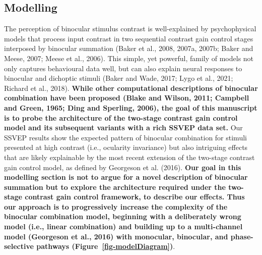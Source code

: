 \documentclass[
  12pt,
]{article}
\begin{document}
\subsection{Modelling}\label{modelling}

The perception of binocular stimulus contrast is well-explained by
psychophysical models that process input contrast in two sequential
contrast gain control stages interposed by binocular summation (Baker et
al., 2008, 2007a, 2007b; Baker and Meese, 2007; Meese et al., 2006).
This simple, yet powerful, family of models not only captures
behavioural data well, but can also explain neural responses to
binocular and dichoptic stimuli (Baker and Wade, 2017; Lygo et al.,
2021; Richard et al., 2018). \textbf{While other computational
descriptions of binocular combination have been proposed (Blake and
Wilson, 2011; Campbell and Green, 1965; Ding and Sperling, 2006), the
goal of this manuscript is to probe the architecture of the two-stage
contrast gain control model and its subsequent variants with a rich
SSVEP data set.} Our SSVEP results show the expected pattern of
binocular combination for stimuli presented at high contrast (i.e.,
ocularity invariance) but also intriguing effects that are likely
explainable by the most recent extension of the two-stage contrast gain
control model, as defined by Georgeson et al. (2016). \textbf{Our goal
in this modelling section is not to argue for a novel description of
binocular summation but to explore the architecture required under the
two-stage contrast gain control framework, to describe our effects. Thus
our approach is to progressively increase the complexity of the
binocular combination model, beginning with a deliberately wrong model
(i.e., linear combination) and building up to a multi-channel model
(Georgeson et al., 2016) with monocular, binocular, and phase-selective
pathways (Figure~\ref{fig-modelDiagram})}.
\end{document}

